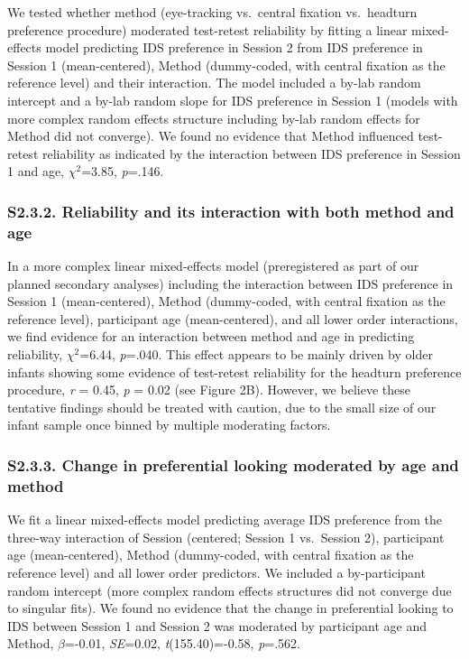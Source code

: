\documentclass[
  man, donotrepeattitle,floatsintext]{apa6}
\begin{document}
We tested whether method (eye-tracking vs.~central fixation vs.~headturn preference procedure) moderated test-retest reliability by fitting a linear mixed-effects model predicting IDS preference in Session 2 from IDS preference in Session 1 (mean-centered), Method (dummy-coded, with central fixation as the reference level) and their interaction.
The model included a by-lab random intercept and a by-lab random slope for IDS preference in Session 1 (models with more complex random effects structure including by-lab random effects for Method did not converge).
We found no evidence that Method influenced test-retest reliability as indicated by the interaction between IDS preference in Session 1 and age, \({\chi}^2\)=3.85, \emph{p}=.146.

\hypertarget{s2.3.2.-reliability-and-its-interaction-with-both-method-and-age}{%
\subsubsection{S2.3.2. Reliability and its interaction with both method and age}\label{s2.3.2.-reliability-and-its-interaction-with-both-method-and-age}}

In a more complex linear mixed-effects model (preregistered as part of our planned secondary analyses) including the interaction between IDS preference in Session 1 (mean-centered), Method (dummy-coded, with central fixation as the reference level), participant age (mean-centered), and all lower order interactions, we find evidence for an interaction between method and age in predicting reliability, \({\chi}^2\)=6.44, \emph{p}=.040.
This effect appears to be mainly driven by older infants showing some evidence of test-retest reliability for the headturn preference procedure, \emph{r} = 0.45, \emph{p} = 0.02 (see Figure 2B).
However, we believe these tentative findings should be treated with caution, due to the small size of our infant sample once binned by multiple moderating factors.

\hypertarget{s2.3.3.-change-in-preferential-looking-moderated-by-age-and-method}{%
\subsubsection{S2.3.3. Change in preferential looking moderated by age and method}\label{s2.3.3.-change-in-preferential-looking-moderated-by-age-and-method}}

We fit a linear mixed-effects model predicting average IDS preference from the three-way interaction of Session (centered; Session 1 vs.~Session 2), participant age (mean-centered), Method (dummy-coded, with central fixation as the reference level) and all lower order predictors.
We included a by-participant random intercept (more complex random effects structures did not converge due to singular fits).
We found no evidence that the change in preferential looking to IDS between Session 1 and Session 2 was moderated by participant age and Method, \(\beta\)=-0.01, \emph{SE}=0.02, \emph{t}(155.40)=-0.58, \emph{p}=.562.
\end{document}
